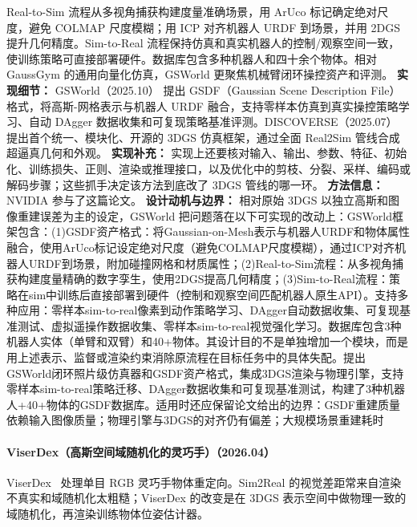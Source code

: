 Real-to-Sim 流程从多视角捕获构建度量准确场景，用 ArUco 标记确定绝对尺度，避免 COLMAP 尺度模糊；用 ICP 对齐机器人 URDF 到场景，并用 2DGS 提升几何精度。Sim-to-Real 流程保持仿真和真实机器人的控制/观察空间一致，使训练策略可直接部署硬件。数据库包含多种机器人和四十余个物体。相对 GaussGym 的通用向量化仿真，GSWorld 更聚焦机械臂闭环操控资产和评测。
\textbf{实现细节：} GSWorld（2025.10） 提出 GSDF（Gaussian Scene Description File）格式，将高斯-网格表示与机器人 URDF 融合，支持零样本仿真到真实操控策略学习、自动 DAgger 数据收集和可复现策略基准评测。DISCOVERSE（2025.07） 提出首个统一、模块化、开源的 3DGS 仿真框架，通过全面 Real2Sim 管线合成超逼真几何和外观。
\textbf{实现补充：} 实现上还要核对输入、输出、参数、特征、初始化、训练损失、正则、渲染或推理接口，以及优化中的剪枝、分裂、采样、编码或解码步骤；这些抓手决定该方法到底改了 3DGS 管线的哪一环。
\textbf{方法信息：} NVIDIA 参与了这篇论文。
\textbf{设计动机与边界：} 相对原始 3DGS 以独立高斯和图像重建误差为主的设定，GSWorld 把问题落在以下可实现的改动上：GSWorld框架包含：(1)GSDF资产格式：将Gaussian-on-Mesh表示与机器人URDF和物体属性融合，使用ArUco标记设定绝对尺度（避免COLMAP尺度模糊），通过ICP对齐机器人URDF到场景，附加碰撞网格和材质属性；(2)Real-to-Sim流程：从多视角捕获构建度量精确的数字孪生，使用2DGS提高几何精度；(3)Sim-to-Real流程：策略在sim中训练后直接部署到硬件（控制和观察空间匹配机器人原生API）。支持多种应用：零样本sim-to-real像素到动作策略学习、DAgger自动数据收集、可复现基准测试、虚拟遥操作数据收集、零样本sim-to-real视觉强化学习。数据库包含3种机器人实体（单臂和双臂）和40+物体。其设计目的不是单独增加一个模块，而是用上述表示、监督或渲染约束消除原流程在目标任务中的具体失配。提出GSWorld闭环照片级仿真器和GSDF资产格式，集成3DGS渲染与物理引擎，支持零样本sim-to-real策略迁移、DAgger数据收集和可复现基准测试，构建了3种机器人+40+物体的GSDF数据库。适用时还应保留论文给出的边界：GSDF重建质量依赖输入图像质量；物理引擎与3DGS的对齐仍有偏差；大规模场景重建耗时
\paragraph{ViserDex（高斯空间域随机化的灵巧手）（2026.04）}
ViserDex~\cite{2604_11138} 处理单目 RGB 灵巧手物体重定向。Sim2Real 的视觉差距常来自渲染不真实和域随机化太粗糙；ViserDex 的改变是在 3DGS 表示空间中做物理一致的域随机化，再渲染训练物体位姿估计器。

